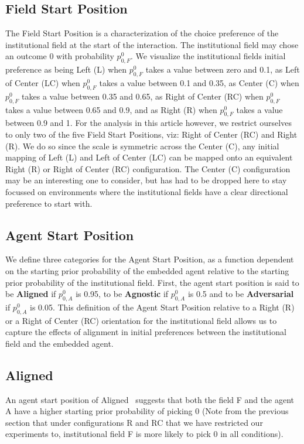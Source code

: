 \documentclass[12pt,letterpaper]{article}
\begin{document}
\subsection{Field Start Position}
The Field Start Position is a characterization of the choice preference of the institutional field at the start of the interaction. The institutional field may chose an outcome 0 with probability  $p_{0,F}^0$. We visualize the institutional field\textquotesingle s initial preference as being Left (L) when $p_{0,F}^0$ takes a value between zero and 0.1, as Left of Center (LC) when $p_{0,F}^0$ takes a value between 0.1 and 0.35, as Center (C) when $p_{0,F}^0$ takes a value between 0.35 and 0.65,  as  Right of Center (RC) when $p_{0,F}^0$ takes a value between 0.65 and 0.9, and as Right (R) when $p_{0,F}^0$ takes a value between 0.9 and 1. For the analysis in this article however, we restrict ourselves to only two of the five Field Start Positions, viz: Right of Center (RC) and Right (R). We do so since the scale is symmetric across the Center (C), any initial mapping of Left (L) and Left of Center (LC) can be mapped onto an equivalent Right (R) or Right of Center (RC) configuration. The Center (C) configuration may be an interesting one to consider, but has had to be dropped here to stay focussed on environments where the institutional fields have a clear directional preference to start with.

\subsection{Agent Start Position}
We define three categories for the Agent Start Position, as a function dependent on the starting prior probability of the embedded agent relative to the starting prior probability of the institutional field. First, the agent start position is said to be \textbf{Aligned} if $p_{0,A}^0$ is 0.95, to be \textbf{Agnostic} if $p_{0,A}^0$ is 0.5 and to be \textbf{Adversarial} if $p_{0,A}^0$ is 0.05. This definition of the Agent Start Position relative to a Right (R) or a Right of Center (RC) orientation for the institutional field allows us to capture the effects of alignment in initial preferences between the institutional field and the embedded agent. 

\subsection{Aligned} 
An agent start position of \textquotesingle Aligned \textquotesingle \ suggests that both the field F and the agent A have a higher starting prior probability of picking 0 (Note from the previous section that under configurations R and RC that we have restricted our experiments to, institutional field F is more likely to pick 0 in all conditions). 
\end{document}
